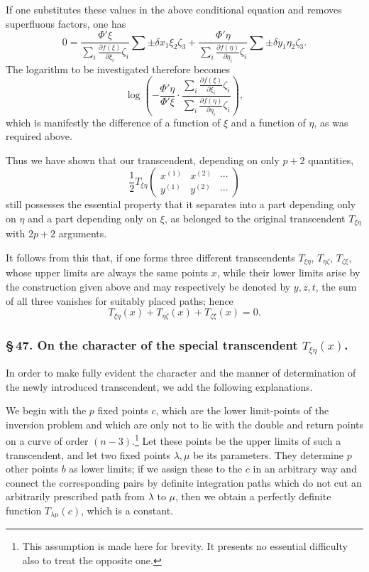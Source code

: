 \documentclass[10pt]{article}
\begin{document}
If one substitutes these values in the above conditional equation and removes superfluous factors, one has
\[
0=\frac{\Phi'\xi}{\sum_i \frac{\partial f(\xi)}{\partial \xi_i}\zeta_i}
\sum\pm\delta x_1\xi_2\zeta_3
+\frac{\Phi'\eta}{\sum_i \frac{\partial f(\eta)}{\partial \eta_i}\zeta_i}
\sum\pm\delta y_1\eta_2\zeta_3 .
\]
The logarithm to be investigated therefore becomes
\[
\log\left(-\frac{\Phi'\eta}{\Phi'\xi}\cdot
\frac{\sum_i \frac{\partial f(\xi)}{\partial \xi_i}\zeta_i}
{\sum_i \frac{\partial f(\eta)}{\partial \eta_i}\zeta_i}\right),
\]
which is manifestly the difference of a function of \(\xi\) and a function of \(\eta\), as was required above.

Thus we have shown that our transcendent, depending on only \(p+2\) quantities,
\[
\frac12 T_{\xi\eta}\begin{pmatrix}x^{(1)}&x^{(2)}&\cdots\\ y^{(1)}&y^{(2)}&\cdots\end{pmatrix}
\]
still possesses the essential property that it separates into a part depending only on \(\eta\) and a part depending only on \(\xi\), as belonged to the original transcendent \(T_{\xi\eta}\) with \(2p+2\) arguments.

It follows from this that, if one forms three different transcendents \(T_{\xi\eta}\), \(T_{\eta\zeta}\), \(T_{\zeta\xi}\), whose upper limits are always the same points \(x\), while their lower limits arise by the construction given above and may respectively be denoted by \(y,z,t\), the sum of all three vanishes for suitably placed paths; hence
\[
T_{\xi\eta}(x)+T_{\eta\zeta}(x)+T_{\zeta\xi}(x)=0.
\]

\subsubsection*{\S\,47. On the character of the special transcendent \(T_{\xi\eta}(x)\).}

In order to make fully evident the character and the manner of determination of the newly introduced transcendent, we add the following explanations.

We begin with the \(p\) fixed points \(c\), which are the lower limit-points of the inversion problem and which are only not to lie with the double and return points on a curve of order \((n-3)\).\footnote{This assumption is made here for brevity. It presents no essential difficulty also to treat the opposite one.} Let these points be the upper limits of such a transcendent, and let two fixed points \(\lambda,\mu\) be its parameters. They determine \(p\) other points \(b\) as lower limits; if we assign these to the \(c\) in an arbitrary way and connect the corresponding pairs by definite integration paths which do not cut an arbitrarily prescribed path from \(\lambda\) to \(\mu\), then we obtain a perfectly definite function \(T_{\lambda\mu}(c)\), which is a constant.
\end{document}
